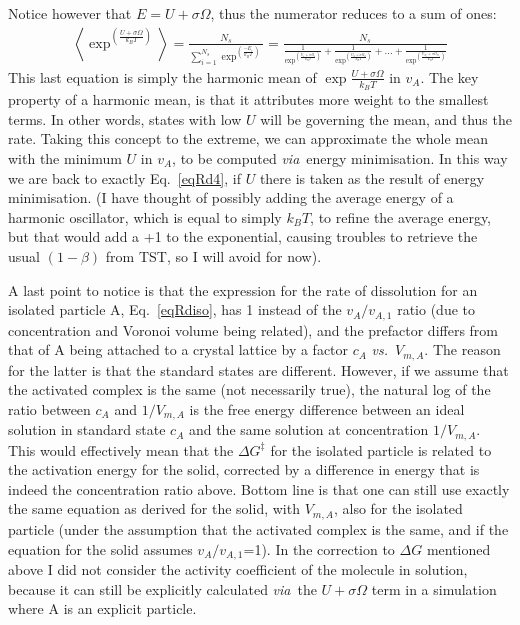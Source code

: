 \documentclass[12pt]{paper}    %
\newcommand{\via}{\textit{via}~}
\newcommand{\vs}{\textit{vs.}~}
\newcommand{\eqname}{Eq.~}
\begin{document}
%
Notice however that $E = U+\sigma\Omega$, thus the numerator reduces to a sum of ones:
%
\begin{eqnarray}
\left\langle \exp^{\left( \frac{U + \sigma \Omega}{k_BT}\right)} \right\rangle  = \frac{N_s}{\sum_{i=1}^{N_s} \exp^{\left( \frac{-E_i}{k_BT}\right)}} = \frac{N_s}{\frac{1}{\exp^{\left( \frac{U_1+\sigma\Omega _1}{k_BT}\right)}}+\frac{1}{\exp^{\left( \frac{U_2+\sigma\Omega _2}{k_BT}\right)}}+...+\frac{1}{\exp^{\left( \frac{U_{N_s}+\sigma\Omega _{N_s}}{k_BT}\right)}}}
\end{eqnarray}
%
This last equation is simply the harmonic mean of $\exp{\frac{U+\sigma\Omega}{k_BT}}$ in $v_A$. The key property of a harmonic mean, is that it attributes more weight to the smallest terms. In other words, states with low $U$ will be governing the mean, and thus the rate. Taking this concept to the extreme, we can approximate the whole mean with the minimum $U$ in $v_A$, to be computed \via energy minimisation. In this way we are back to exactly \eqname\ref{eqRd4}, if $U$ there is taken as the result of energy minimisation. (I have thought of possibly adding the average energy of a harmonic oscillator, which is equal to simply $k_BT$, to refine the average energy, but that would add a +1 to the exponential, causing troubles to retrieve the usual $(1-\beta)$ from TST, so I will avoid for now).

A last point to notice is that the expression for the rate of dissolution for an isolated particle A, \eqname\ref{eqRdiso}, has 1 instead of the $v_A/v_{A,1}$ ratio (due to concentration and Voronoi volume being related), and the prefactor differs from that of A being attached to a crystal lattice by a factor $c_A$ \vs $V_{m,A}$. The reason for the latter is that the standard states are different. However, if we assume that the activated complex is the same (not necessarily true), the natural log of the ratio between $c_A$ and $1/V_{m,A}$ is the free energy difference between an ideal solution in standard state $c_A$ and the same solution at concentration $1/V_{m,A}$. This would effectively mean that the $\Delta G^\ddag$ for the isolated particle is related to the activation energy for the solid, corrected by a difference in energy that is indeed the concentration ratio above. Bottom line is that one can still use exactly the same equation as derived for the solid, with $V_{m,A}$, also for the isolated particle (under the assumption that the activated complex is the same, and if the equation for the solid assumes $v_A/v_{A,1}$=1). In the correction to $\Delta G$ mentioned above I did not consider the activity coefficient of the molecule in solution, because it can still be explicitly calculated \via the $U+\sigma\Omega$ term in a simulation where A is an explicit particle.
\end{document}
